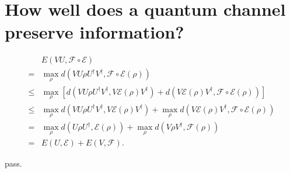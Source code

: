 \section{How well does a quantum channel preserve information?}

\ex $$\begin{aligned}
& E(VU, \mathcal{F}\circ\mathcal{E})
\\ = & \max_{\rho} d(VU\rho U^\dagger V^\dagger, \mathcal{F}\circ\mathcal{E}(\rho))
\\ \le & \max_{\rho} [d(VU\rho U^\dagger V^\dagger, V\mathcal{E}(\rho)V^\dagger) + d(V\mathcal{E}(\rho)V^\dagger, \mathcal{F}\circ\mathcal{E}(\rho))]
\\ \le & \max_{\rho} d(VU\rho U^\dagger V^\dagger, V\mathcal{E}(\rho)V^\dagger) + \max_{\rho} d(V\mathcal{E}(\rho)V^\dagger, \mathcal{F}\circ\mathcal{E}(\rho))
\\ = & \max_{\rho} d(U\rho U^\dagger, \mathcal{E}(\rho)) + \max_{\rho} d(V\rho V^\dagger, \mathcal{F}(\rho))
\\ = & E(U, \mathcal{E}) + E(V, \mathcal{F}).
\end{aligned}$$

\ex pass.